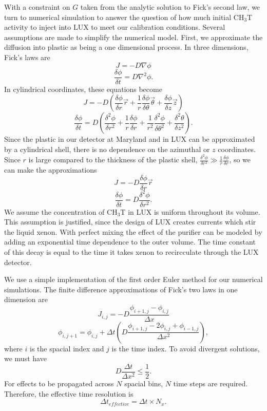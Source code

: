With a constraint on $G$ taken from the analytic solution to Fick's second law, we turn to numerical simulation to answer the question of how much initial CH$_3$T activity to inject into LUX to meet our calibration conditions.  Several assumptions are made to simplify the numerical model.  First, we approximate the diffusion into plastic as being a one dimensional process. In three dimensions, Fick's laws are
\[J=-D\nabla \phi\]
\[\frac{\delta\phi}{\delta t} = D \nabla^2 \phi .\]
In cylindrical coordinates, these equations become
\[J = -D (\frac{\delta \phi}{\delta r} \vec{r} + \frac{1}{r}\frac{\delta \phi}{\delta \theta}\vec{\theta} + \frac{\delta \phi}{\delta z}\vec{z})\]
\[\frac{\delta \phi}{\delta t} = D ( \frac{\delta^2\phi}{\delta r^2} + \frac{1}{r}\frac{\delta \phi}{\delta r} + \frac{1}{r^2}\frac{\delta^2 \phi}{\delta \theta^2} + \frac{\delta^2 \theta}{\delta z^2}).\]
Since the plastic in our detector at Maryland and in LUX can be approximated by a cylindrical shell, there is no dependence on the azimuthal or $z$ coordinates.  Since $r$ is large compared to the thickness of the plastic shell, $\frac{\delta^2 \phi}{\delta r^2} \gg \frac{1}{r} \frac {\delta \phi}{\delta r}$, so we can make the approximations
\[J=-D\frac{\delta \phi}{\delta r}\vec{r}\]
\[\frac{\delta \phi}{\delta t} = D \frac{\delta^2 \phi}{\delta r^2}.\]  We assume the concentration of CH$_3$T in LUX is uniform throughout its volume.  This assumption is justified, since the design of LUX creates currents which stir the liquid xenon.  With perfect mixing the effect of the purifier can be modeled by adding an exponential time dependence to the outer volume.  The time constant of this decay is equal to the time it takes xenon to recircculate through the LUX detector.

We use a simple implementation of the first order Euler method for our numerical simulations.  The finite difference approximations of Fick's two laws in one dimension are 
\[J_{i,j} = -D \frac{\phi_{i+1,j}-\phi_{i,j}}{\Delta x }\]
\[\phi_{i,j+1} = \phi_{i,j} + \Delta t (D \frac{\phi_{i+1,j} - 2 \phi_{i,j} + \phi_{i-1,j}}{\Delta x^2}),\]
where $i$ is the spacial index and $j$ is the time index.  To avoid divergent solutions, we must have
\[D \frac{\Delta t}{\Delta x^2} \leq \frac{1}{2}.\]
For effects to be propagated across $N$ spacial bins, $N$ time steps are required.  Therefore, the effective time resolution is
\[\Delta t_{effective} = \Delta t \times N_x.\]

